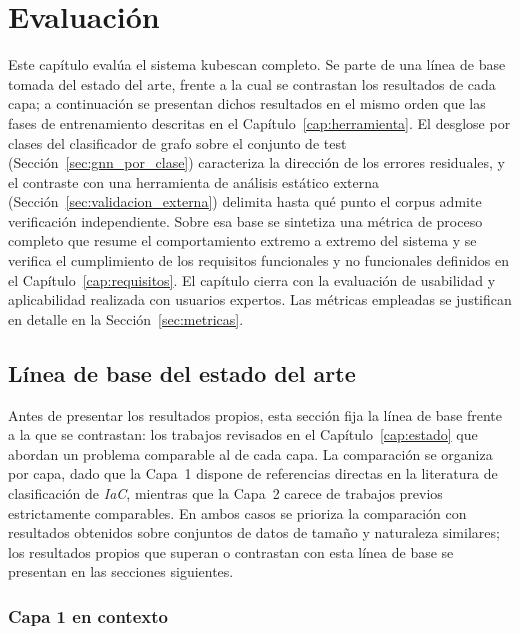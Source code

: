 \chapter{Evaluación}
\label{cap:evaluacion}

Este capítulo evalúa el sistema kubescan completo. Se parte de una
línea de base tomada del estado del arte, frente a la cual se contrastan los
resultados de cada capa; a continuación se presentan dichos resultados en el
mismo orden que las fases de entrenamiento descritas en el
Capítulo~\ref{cap:herramienta}. El desglose por clases del clasificador de grafo
sobre el conjunto de test (Sección~\ref{sec:gnn_por_clase}) caracteriza la
dirección de los errores residuales, y el contraste con una herramienta de
análisis estático externa (Sección~\ref{sec:validacion_externa}) delimita hasta
qué punto el corpus admite verificación independiente. Sobre esa base se
sintetiza una métrica de proceso completo que resume el comportamiento extremo a
extremo del sistema y se verifica el cumplimiento de los requisitos funcionales y
no funcionales definidos en el Capítulo~\ref{cap:requisitos}. El capítulo cierra
con la evaluación de usabilidad y aplicabilidad realizada con usuarios expertos.
Las métricas empleadas se justifican en detalle en la
Sección~\ref{sec:metricas}.

\section{Línea de base del estado del arte}
\label{sec:linea_base}

Antes de presentar los resultados propios, esta sección fija la línea de base
frente a la que se contrastan: los trabajos revisados en el
Capítulo~\ref{cap:estado} que abordan un problema comparable al de cada capa. La
comparación se organiza por capa, dado que la Capa~1 dispone de referencias
directas en la literatura de clasificación de \textit{IaC}, mientras que la
Capa~2 carece de trabajos previos estrictamente comparables. En ambos casos se
prioriza la comparación con resultados obtenidos sobre conjuntos de datos de
tamaño y naturaleza similares; los resultados propios que superan o contrastan
con esta línea de base se presentan en las secciones siguientes.

\subsection{Capa 1 en contexto}

